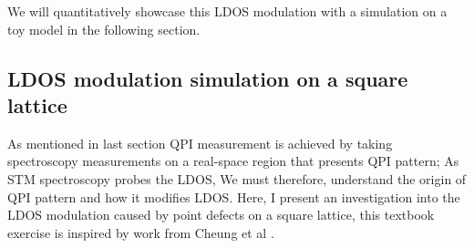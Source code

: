 We will quantitatively showcase this \ac{LDOS} modulation with a simulation on a toy model in the following section. 


\subsection{LDOS modulation simulation on a square lattice}

As mentioned in last section \ac{QPI} measurement is achieved by taking spectroscopy measurements on a real-space region that presents QPI pattern; As \ac{STM} spectroscopy probes the \ac{LDOS}, We must therefore, understand the origin of \ac{QPI} pattern and how it modifies \ac{LDOS}. Here, I present an investigation into the \ac{LDOS} modulation caused by point defects on a square lattice, this textbook exercise is inspired by work from Cheung et al \cite{cheungDictionaryLearningFouriertransform2020}.

